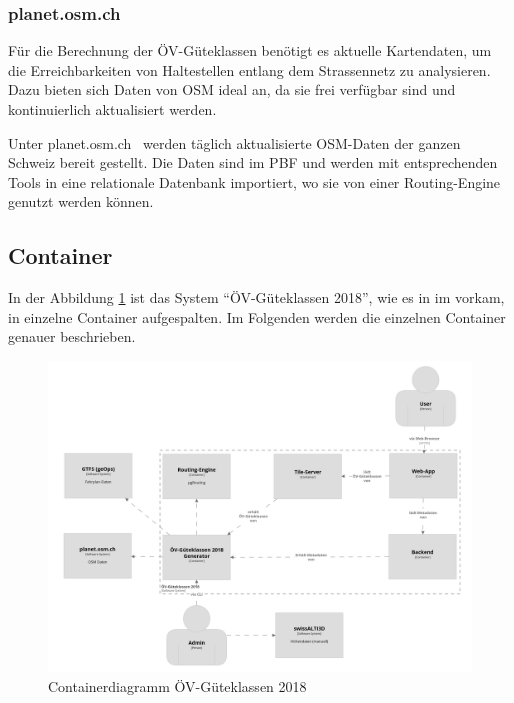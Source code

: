 \subsubsection{planet.osm.ch}
\label{subsystem:planet.osm.ch}

Für die Berechnung der ÖV-Güteklassen benötigt es aktuelle Kartendaten, um die Erreichbarkeiten von Haltestellen entlang dem Strassennetz zu analysieren.
Dazu bieten sich Daten von \ac{OSM} ideal an, da sie frei verfügbar sind und kontinuierlich aktualisiert werden.

Unter planet.osm.ch~\cite{planet_osm_ch} werden täglich aktualisierte \ac{OSM}-Daten der ganzen Schweiz bereit gestellt.
Die Daten sind im \ac{PBF} und werden mit entsprechenden Tools in eine relationale Datenbank importiert, wo sie von einer Routing-Engine genutzt werden können.


\subsection{Container}
\label{Architektur:Container}

In der Abbildung \ref{fig:container-diagram} ist das System "`ÖV-Güteklassen 2018"', wie es in im  vorkam, in einzelne Container aufgespalten.
Im Folgenden werden die einzelnen Container genauer beschrieben.

\begin{figure}[ht]
    \centering
    \includegraphics[width=1.0\linewidth]{projectdoc/img/container-diagram.png}
    \caption[Containerdiagramm]{Containerdiagramm ÖV-Güteklassen 2018}
    \label{fig:container-diagram}
\end{figure}

